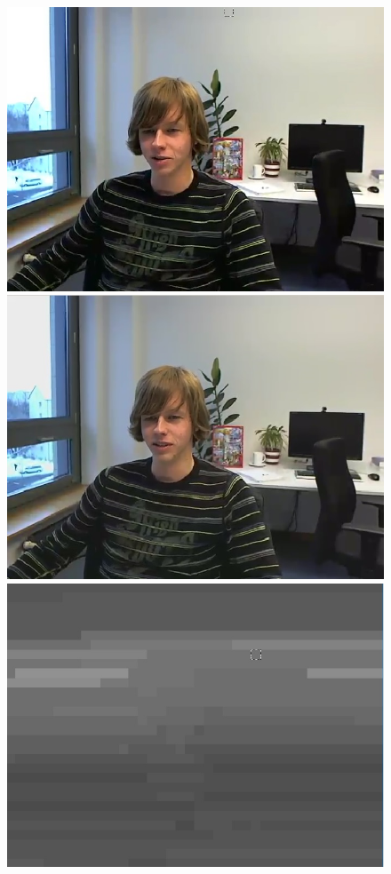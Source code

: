 \documentclass[11pt]{article} %
\begin{document}
\begin{figure}[!h]
    \includegraphics[scale=0.4]{PaulDefault120_91250kbps}
    \includegraphics[scale=0.4]{QPOffset/paul120_250kbps_QPoffset4}
    \includegraphics[scale=0.37]{PaulDefault120_91250kbps_quant}

\end{figure}
\end{document}
